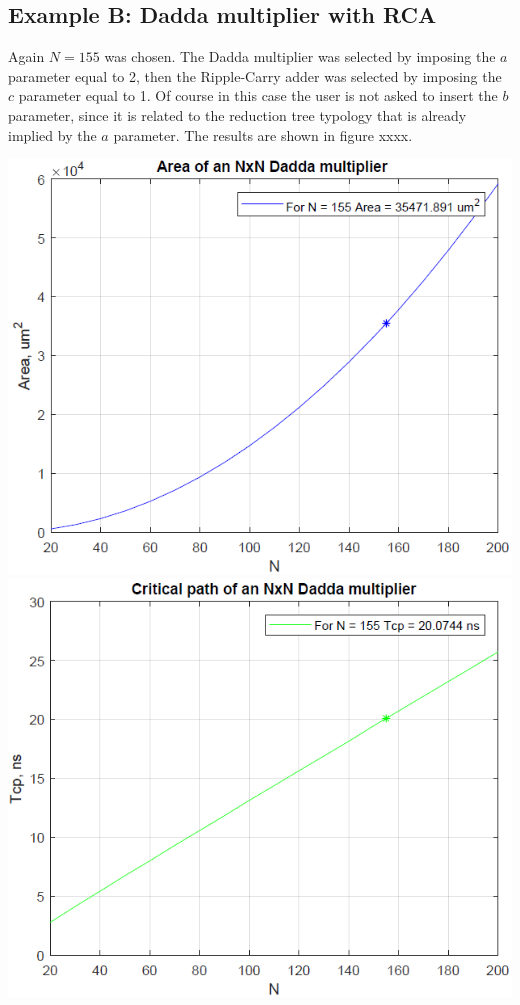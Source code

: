 \documentclass[11pt]{article} %
\begin{document}
\subsection{Example B: Dadda multiplier with RCA}
Again $N = 155$ was chosen. The Dadda multiplier was selected by imposing the $a$ parameter equal to 2, then the Ripple-Carry adder was selected by imposing the $c$ parameter equal to 1. Of course in this case the user is not asked to insert the $b$ parameter, since it is related to the reduction tree typology that is already implied by the $a$ parameter. The results are shown in figure xxxx.
\vspace{1em}
\begin{center}
\includegraphics[scale=.48]{area_dadda_rca.PNG}
\includegraphics[scale=.48]{tcp_dadda_rca.PNG}\\

\end{center}
\end{document}
